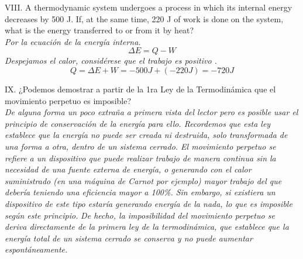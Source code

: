 \documentclass{article}
\begin{document}
VIII. A thermodynamic system undergoes a process in which its internal energy decreases by 500 J. If, at the same time, 220 J of work is done on the system, what is the energy transferred to or from it by heat? \\
\textit{Por la ecuación de la energía interna.}
\begin{equation}
    \Delta E = Q - W
\end{equation}
\textit{Despejamos el calor, considérese que el trabajo es positivo .}
\begin{equation*}
    Q = \Delta E + W = -500J + (-220J) = -720J
\end{equation*}

\noindent IX. ¿Podemos demostrar a partir de la 1ra Ley de la Termodinámica que el movimiento perpetuo es imposible?\\
\textit{De alguna forma un poco extraña a primera vista del lector pero es posible usar el principio de conservación de la energía para ello. Recordemos que esta ley establece que la energía no puede ser creada ni destruida, solo transformada de una forma a otra, dentro de un sistema cerrado. El movimiento perpetuo se refiere a un dispositivo que puede realizar trabajo de manera continua sin la necesidad de una fuente externa de energía, o generando con el calor suministrado (en una máquina de Carnot por ejemplo) mayor trabajo del que debería teniendo una eficiencia mayor a 100\%. Sin embargo, si existiera un dispositivo de este tipo estaría generando energía de la nada, lo que es imposible según este principio.}
\textit{De hecho, la imposibilidad del movimiento perpetuo se deriva directamente de la primera ley de la termodinámica, que establece que la energía total de un sistema cerrado se conserva y no puede aumentar espontáneamente.} \\\\
\end{document}
